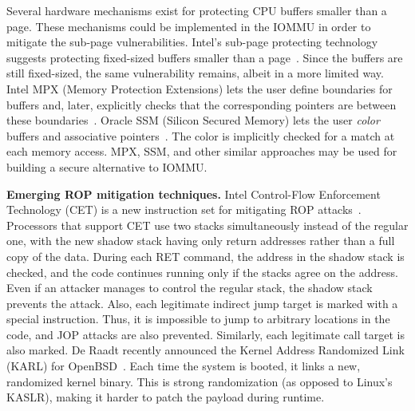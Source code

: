 Several hardware mechanisms exist for protecting CPU buffers smaller than a page. These mechanisms could be implemented in the IOMMU in order to mitigate the sub-page vulnerabilities. Intel’s sub-page protecting technology suggests protecting fixed-sized buffers smaller than a page~\cite{Int18}. Since the buffers are still fixed-sized, the same vulnerability remains, albeit in a more limited way. Intel MPX (Memory Protection Extensions) lets the user define boundaries for buffers and, later, explicitly checks that the corresponding pointers are between these boundaries~\cite{Int16a}. Oracle SSM (Silicon Secured Memory) lets the user \emph{color} buffers and associative pointers~\cite{Ora15}. The color is implicitly checked for a match at each memory access. MPX, SSM, and other similar approaches may be used for building a secure alternative to IOMMU. 

\smallskip
\noindent\textbf{Emerging ROP mitigation techniques.}
Intel Control-Flow Enforcement Technology (CET) is a new instruction set for mitigating ROP attacks~\cite{Int17}. Processors that support CET use two stacks simultaneously instead of the regular one, with the new shadow stack having only return addresses rather than a full copy of the data. During each RET command, the address in the shadow stack is checked, and the code continues running only if the stacks agree on the address. Even if an attacker manages to control the regular stack, the shadow stack prevents the attack. Also, each legitimate indirect jump target is marked with a special instruction. Thus, it is impossible to jump to arbitrary locations in the code, and JOP attacks are also prevented. Similarly, each legitimate call target is also marked. De Raadt recently announced the Kernel Address Randomized Link (KARL) for OpenBSD~\cite{dr17}. Each time the system is booted, it links a new, randomized kernel binary. This is strong randomization (as opposed to Linux’s KASLR), making it harder to patch the payload during runtime. 

